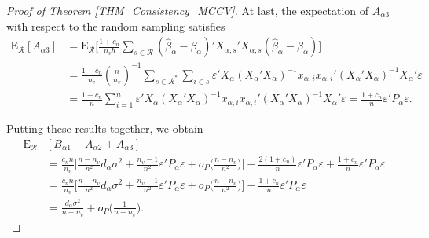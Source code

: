 \documentclass[Research_Module_ES.tex]{subfiles}
\begin{document}
\begin{proof}[Proof of Theorem \ref{THM_Consistency_MCCV}]
	At last, the expectation of $A_{\alpha3}$ with respect to the random sampling satisfies
	\begin{align*}
	\mathrm{E}_\mathcal{R}[A_{\alpha3}] 
	&=\mathrm{E}_\mathcal{R}\biggl[ \frac{1+c_n}{n_vb}\sum_{s\in \mathcal{R}}(\hat{\beta}_\alpha-\beta_\alpha)'X_{\alpha,s}'X_{\alpha,s}(\hat{\beta}_\alpha-\beta_\alpha)\biggr]\\
	&= \frac{1+c_n}{n_v}\binom{n}{n_v}^{-1}\sum_{s\in\mathcal{R}^\ast}\sum_{i\in s}\varepsilon'X_{\alpha}(X_{\alpha}'X_{\alpha})^{-1}x_{\alpha,i}x_{\alpha,i}'(X_{\alpha}'X_{\alpha})^{-1}X_{\alpha}'\varepsilon\\
	&= \frac{1+c_n}{n}\sum_{i=1}^n\varepsilon'X_{\alpha}(X_{\alpha}'X_{\alpha})^{-1}x_{\alpha,i}x_{\alpha,i}'(X_{\alpha}'X_{\alpha})^{-1}X_{\alpha}'\varepsilon
	= \frac{1+c_n}{n}\varepsilon'P_\alpha\varepsilon.
	\end{align*}
	
	Putting these results together, we obtain
	\begin{align*}
	\mathrm{E}_\mathcal{R}&[B_{\alpha1}-A_{\alpha2}+A_{\alpha3}]\\
	&= \frac{c_nn}{n_v}\biggl[\frac{n-n_v}{n^2}d_\alpha\sigma^2
	+\frac{n_v-1}{n^2}\varepsilon'P_\alpha\varepsilon + o_P\biggl(\frac{n-n_v}{n^2}\biggr)\biggr]
	-\frac{2(1+c_n)}{n} \varepsilon'P_\alpha\varepsilon
	+\frac{1+c_n}{n}\varepsilon'P_\alpha\varepsilon\\
	&= \frac{c_nn}{n_v}\biggl[\frac{n-n_v}{n^2}d_\alpha\sigma^2
	+\frac{n_v-1}{n^2}\varepsilon'P_\alpha\varepsilon + o_P\biggl(\frac{n-n_v}{n^2}\biggr)\biggr]
	-\frac{1+c_n}{n} \varepsilon'P_\alpha\varepsilon\\
	&=\frac{d_\alpha\sigma^2}{n-n_v}+ o_P\biggl(\frac{1}{n-n_v}\biggr).
	\end{align*}
	

\end{proof}
\end{document}
